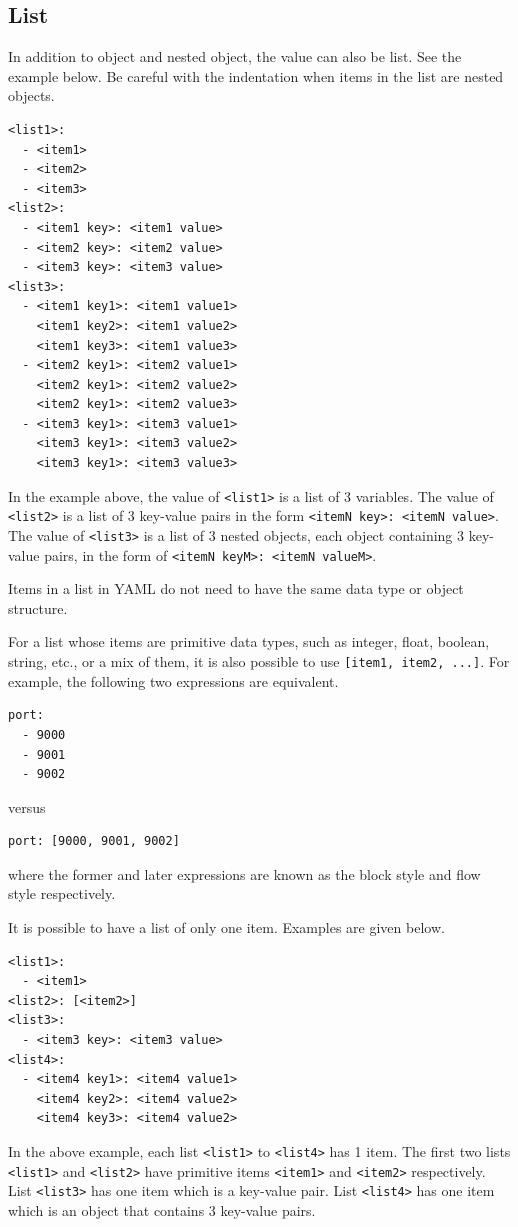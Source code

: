 \subsection{List}

In addition to object and nested object, the value can also be list. See the example below. Be careful with the indentation when items in the list are nested objects.
\begin{lstlisting}
<list1>:
  - <item1>
  - <item2>
  - <item3>
<list2>:
  - <item1 key>: <item1 value>
  - <item2 key>: <item2 value>
  - <item3 key>: <item3 value>
<list3>:
  - <item1 key1>: <item1 value1>
    <item1 key2>: <item1 value2>
    <item1 key3>: <item1 value3>
  - <item2 key1>: <item2 value1>
    <item2 key1>: <item2 value2>
    <item2 key1>: <item2 value3>
  - <item3 key1>: <item3 value1>
    <item3 key1>: <item3 value2>
    <item3 key1>: <item3 value3>
\end{lstlisting}
In the example above, the value of \verb|<list1>| is a list of 3 variables. The value of \verb|<list2>| is a list of 3 key-value pairs in the form \verb|<itemN key>: <itemN value>|. The value of \verb|<list3>| is a list of 3 nested objects, each object containing 3 key-value pairs, in the form of \verb|<itemN keyM>: <itemN valueM>|.

Items in a list in YAML do not need to have the same data type or object structure.

For a list whose items are primitive data types, such as integer, float, boolean, string, etc., or a mix of them, it is also possible to use \verb|[item1, item2, ...]|. For example, the following two expressions are equivalent.
\begin{lstlisting}
port:
  - 9000
  - 9001
  - 9002
\end{lstlisting}
versus
\begin{lstlisting}
port: [9000, 9001, 9002]
\end{lstlisting}
where the former and later expressions are known as the block style and flow style respectively.

It is possible to have a list of only one item. Examples are given below.
\begin{lstlisting}
<list1>:
  - <item1>
<list2>: [<item2>]
<list3>:
  - <item3 key>: <item3 value>
<list4>:
  - <item4 key1>: <item4 value1>
    <item4 key2>: <item4 value2>
    <item4 key3>: <item4 value2>
\end{lstlisting}
In the above example, each list \verb|<list1>| to \verb|<list4>| has 1 item. The first two lists \verb|<list1>| and \verb|<list2>| have primitive items \verb|<item1>| and \verb|<item2>| respectively. List \verb|<list3>| has one item which is a key-value pair. List \verb|<list4>| has one item which is an object that contains 3 key-value pairs.

